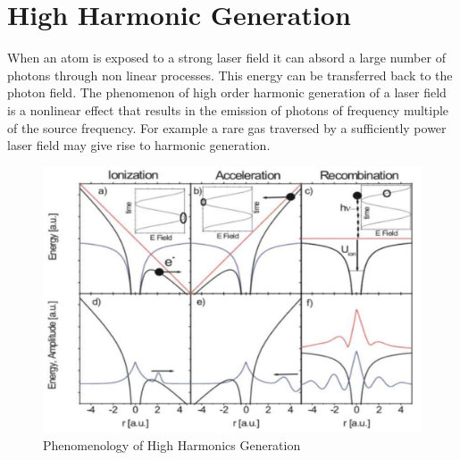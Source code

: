 \section{High Harmonic Generation}
When an atom is exposed to a strong laser field it can absord a large number of photons through non linear processes. This energy can be transferred back to the photon field.
The phenomenon of high order harmonic generation of a laser field is a nonlinear effect that results in the emission of photons of frequency multiple of the source frequency. For example a rare gas traversed by a sufficiently power laser field may give rise to harmonic generation.
\begin{figure}[htbp]
\begin{center}
\includegraphics[width=12cm]{../Pictures/Chapter_7/HHG}
\end{center}
\caption[HHG phenomenology]{Phenomenology of High Harmonics Generation}
\label{fig:HHG}
\end{figure}

